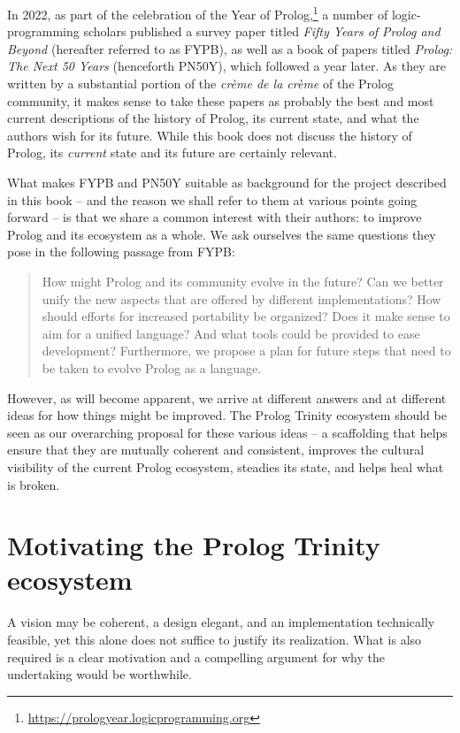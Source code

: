 In 2022, as part of the celebration of the Year of Prolog,\footnote{\url{https://prologyear.logicprogramming.org}} a number of logic-programming scholars published a survey paper titled \textit{Fifty Years of Prolog and Beyond} (hereafter referred to as FYPB), as well as a book of papers titled \textit{Prolog: The Next 50 Years} (henceforth PN50Y), which followed a year later. As they are written by a substantial portion of the \textit{cr\`eme de la cr\`eme} of the Prolog community, it makes sense to take these papers as probably the best and most current descriptions of the history of Prolog, its current state, and what the authors wish for its future. While this book does not discuss the history of Prolog, its \textit{current} state and its future are certainly relevant.

What makes FYPB and PN50Y suitable as background for the project described in this book -- and the reason we shall refer to them at various points going forward -- is that we share a common interest with their authors: to improve Prolog and its ecosystem as a whole. We ask ourselves the same questions they pose in the following passage from FYPB:

\begin{quote}
How might Prolog and its community evolve in the future? Can we better unify the new aspects that are offered by different implementations? How should efforts for increased portability be organized? Does it make sense to aim for a unified language? And what tools could be provided to ease development? Furthermore, we propose a plan for future steps that need to be taken to evolve Prolog as a language.
\end{quote}

\noindent However, as will become apparent, we arrive at different answers and at different ideas for how things might be improved. The Prolog Trinity ecosystem should be seen as our overarching proposal for these various ideas -- a scaffolding that helps ensure that they are mutually coherent and consistent, improves the cultural visibility of the current Prolog ecosystem, steadies its state, and helps heal what is broken.

\section{Motivating the Prolog Trinity ecosystem}

A vision may be coherent, a design elegant, and an implementation technically feasible, yet this alone does not suffice to justify its realization. What is also required is a clear motivation and a compelling argument for why the undertaking would be worthwhile.


